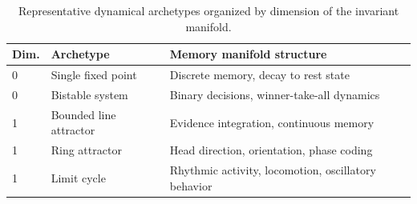 \documentclass{article}
\newcommand{\mpcomment}[1]{\textcolor{mpcolor}{(#1)}}
\theoremstyle{definition} \newtheorem{definition}{Definition}  \newtheorem{example}{Example}
\theoremstyle{remark} \newtheorem{remark}{Remark}
\newcounter{ct}
\begin{document}

\begin{table}[h]
\centering
\caption{Representative dynamical archetypes organized by dimension of the invariant manifold.}
\label{tab:archetypes}
\begin{tabular}{lll}
\toprule
\textbf{Dim.} & \textbf{Archetype} & \textbf{Memory manifold structure} \\
\midrule
0 & Single fixed point      & Discrete memory, decay to rest state \\
0 & Bistable system         & Binary decisions, winner-take-all dynamics \\
\midrule
1 & Bounded line attractor  & Evidence integration, continuous memory \\
1 & Ring attractor          & Head direction, orientation, phase coding \\
1 & Limit cycle             & Rhythmic activity, locomotion, oscillatory behavior \\
\bottomrule
\end{tabular}
\end{table}
\end{document}
